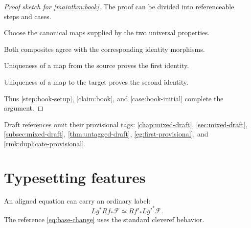 \documentclass[sectionlevel=book,status=draft]{noteformyself}
\begin{document}
\begin{proof}[Proof sketch for \cref{mainthm:book}]
  The proof can be divided into referenceable steps and cases.

  \begin{step}\label{step:book-setup}
    Choose the canonical maps supplied by the two universal properties.
  \end{step}

  \begin{claim}[
    title={The composites are identities},
    label=\labelNFM{claim:book}
  ]
    Both composites agree with the corresponding identity morphisms.
  \end{claim}

  \begin{case}\label{case:book-initial}
    Uniqueness of a map from the source proves the first identity.
  \end{case}

  \begin{case}\label{case:book-terminal}
    Uniqueness of a map to the target proves the second identity.
  \end{case}

  Thus \cref{step:book-setup}, \cref{claim:book}, and
  \cref{case:book-initial} complete the argument.
\end{proof}

Draft references omit their provisional tags: \cref{chap:mixed-draft},
\cref{sec:mixed-draft}, \cref{subsec:mixed-draft},
\cref{thm:untagged-draft}, \cref{eg:first-provisional}, and
\cref{rmk:duplicate-provisional}.

\section[
  short-title={Typesetting features},
  status=draft,
  tag=0CDGH,
  label=\labelNFM{sec:book-features}
]{Typesetting features}

An aligned equation can carry an ordinary label:
\begin{equation}\label{eq:base-change}
  Lg^* Rf_*\mathcal{F} \simeq Rf'_* Lg'^*\mathcal{F}.
\end{equation}
The reference \cref{eq:base-change} uses the standard cleveref behavior.
\end{document}

